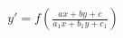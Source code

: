 \documentclass[preview]{standalone}
\begin{document}
\begin{align*}
y\prime=f\left(\frac{ax+by+c}{a_1x+b_1y+c_1}\right)
\end{align*}
\end{document}
